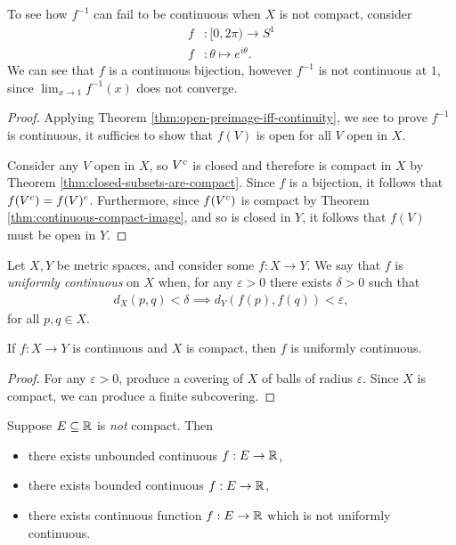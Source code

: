 \begin{exmp}
    To see how $f^{-1}$ can fail to be continuous when $X$ is not compact, consider
    \begin{align*}
        f&: [0, 2\pi) \to S^{1} \\
        f&: \theta \mapsto e^{i\theta}.
    \end{align*}
    We can see that $f$ is a continuous bijection, however $f^{-1}$ is not continuous at $1$, since $\lim_{x \to 1}f^{-1}(x)$ does not converge.
\end{exmp}

\begin{proof}
    Applying Theorem \ref{thm:open-preimage-iff-continuity}, we see to prove $f^{-1}$ is continuous, it sufficies to show that $f(V)$ is open for all $V$ open in $X$.

    Consider any $V$ open in $X$, so $V^{c}$ is closed and therefore is compact in $X$ by Theorem \ref{thm:closed-subsets-are-compact}. Since $f$ is a bijection, it follows that $f(V^{c}) = f(V)^{c}$. Furthermore, since $f(V^{c})$ is compact by Theorem \ref{thm:continuous-compact-image}, and so is closed in $Y$, it follows that $f(V)$ must be open in $Y$.
\end{proof}

\begin{defn}
    Let $X, Y$ be metric spaces, and consider some $f: X \to Y$. We say that $f$ is \emph{uniformly continuous} on $X$ when, for any $\varepsilon > 0$ there exists $\delta > 0$ such that
    \begin{align*}
        d_{X}(p, q) < \delta \implies d_{Y}(f(p), f(q)) < \varepsilon,
    \end{align*}
    for all $p, q \in X$.
\end{defn}

\begin{thm}
    If $f: X \to Y$ is continuous and $X$ is compact, then $f$ is uniformly continuous.
\end{thm}

\begin{proof}
    For any $\varepsilon > 0$, produce a covering of $X$ of balls of radius $\varepsilon$. Since $X$ is compact, we can produce a finite subcovering.
\end{proof}

\begin{thm}
    Suppose $E \subseteq \mathbb{R}$ is \emph{not} compact. Then
    \begin{itemize}
        \item there exists unbounded continuous $f: E \to \mathbb{R}$,
        \item there exists bounded continuous $f: E \to \mathbb{R}$,
        \item there exists continuous function $f: E \to \mathbb{R}$ which is not uniformly continuous.
    \end{itemize}
\end{thm}
